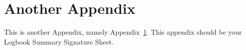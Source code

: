 \chapter{Another Appendix}\label{app:another}

This is another Appendix, namely Appendix~\ref{app:another}. This appendix
should be your Logbook Summary Signature Sheet.
